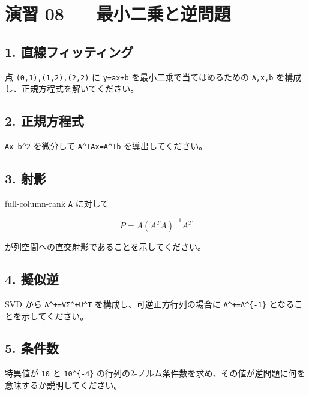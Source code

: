 \documentclass[
  11pt,
  a4paper,
]{ltjsarticle}
\author{}
\date{}
\begin{document}
\hypertarget{ux6f14ux7fd2-08-ux6700ux5c0fux4e8cux4e57ux3068ux9006ux554fux984c}{%
\section{演習 08 ---
最小二乗と逆問題}\label{ux6f14ux7fd2-08-ux6700ux5c0fux4e8cux4e57ux3068ux9006ux554fux984c}}

\hypertarget{ux76f4ux7ddaux30d5ux30a3ux30c3ux30c6ux30a3ux30f3ux30b0}{%
\subsection{1.
直線フィッティング}\label{ux76f4ux7ddaux30d5ux30a3ux30c3ux30c6ux30a3ux30f3ux30b0}}

点 \texttt{(0,1),(1,2),(2,2)} に \texttt{y=ax+b}
を最小二乗で当てはめるための \texttt{A,x,b}
を構成し、正規方程式を解いてください。

\hypertarget{ux6b63ux898fux65b9ux7a0bux5f0f}{%
\subsection{2. 正規方程式}\label{ux6b63ux898fux65b9ux7a0bux5f0f}}

\texttt{\textbar{}\textbar{}Ax-b\textbar{}\textbar{}\^{}2} を微分して
\texttt{A\^{}TAx=A\^{}Tb} を導出してください。

\hypertarget{ux5c04ux5f71}{%
\subsection{3. 射影}\label{ux5c04ux5f71}}

full-column-rank \texttt{A} に対して

\[
P=A(A^TA)^{-1}A^T
\]

が列空間への直交射影であることを示してください。

\hypertarget{ux64ecux4f3cux9006}{%
\subsection{4. 擬似逆}\label{ux64ecux4f3cux9006}}

SVD から \texttt{A\^{}+=VΣ\^{}+U\^{}T} を構成し、可逆正方行列の場合に
\texttt{A\^{}+=A\^{}\{-1\}} となることを示してください。

\hypertarget{ux6761ux4ef6ux6570}{%
\subsection{5. 条件数}\label{ux6761ux4ef6ux6570}}

特異値が \texttt{10} と \texttt{10\^{}\{-4\}}
の行列の2-ノルム条件数を求め、その値が逆問題に何を意味するか説明してください。
\end{document}
